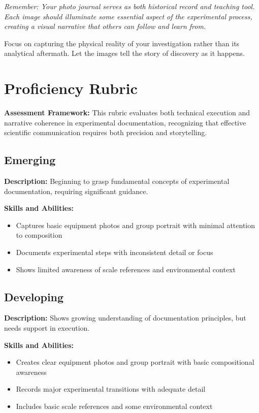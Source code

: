 \documentclass[11pt]{article}
\begin{document}
\vspace{1em}
\noindent\emph{Remember: Your photo journal serves as both historical record and teaching tool. Each image should illuminate some essential aspect of the experimental process, creating a visual narrative that others can follow and learn from.}

\vspace{1em}
\noindent Focus on capturing the physical reality of your investigation rather than its analytical aftermath. Let the images tell the story of discovery as it happens.

\newpage
\section*{Proficiency Rubric}

\begin{conceptbox}
\textbf{Assessment Framework:} This rubric evaluates both technical execution and narrative coherence in experimental documentation, recognizing that effective scientific communication requires both precision and storytelling.
\end{conceptbox}

\subsection*{Emerging}
\textbf{Description:} Beginning to grasp fundamental concepts of experimental documentation, requiring significant guidance.

\noindent\textbf{Skills and Abilities:}
\begin{itemize}[leftmargin=*]
    \item Captures basic equipment photos and group portrait with minimal attention to composition
    \item Documents experimental steps with inconsistent detail or focus
    \item Shows limited awareness of scale references and environmental context
\end{itemize}

\subsection*{Developing}
\textbf{Description:} Shows growing understanding of documentation principles, but needs support in execution.

\noindent\textbf{Skills and Abilities:}
\begin{itemize}[leftmargin=*]
    \item Creates clear equipment photos and group portrait with basic compositional awareness
    \item Records major experimental transitions with adequate detail
    \item Includes basic scale references and some environmental context
\end{itemize}
\end{document}
